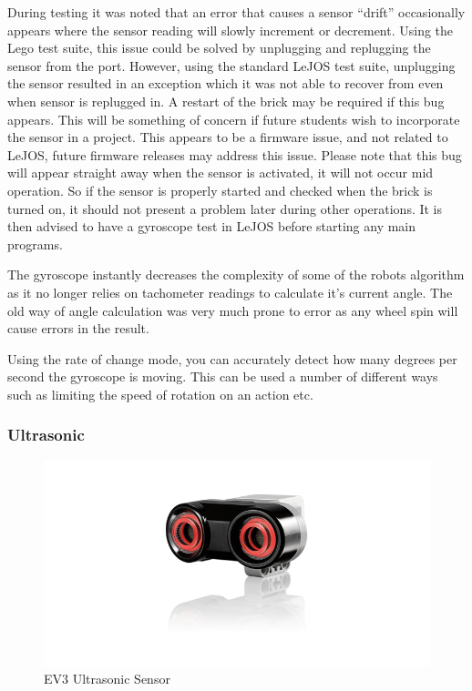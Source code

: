 \documentclass[11pt, a4paper, oneside]{article}
\begin{document}
		During testing it was noted that an error that causes a sensor “drift” occasionally appears where the sensor reading will slowly increment or decrement. Using the Lego test suite, this issue could be solved by unplugging and replugging the sensor from the port. However, using the standard LeJOS test suite, unplugging the sensor resulted in an exception which it was not able to recover from even when sensor is replugged in. A restart of the brick may be required if this bug appears. This will be something of concern if future students wish to incorporate the sensor in a project. This appears to be a firmware issue, and not related to LeJOS, future firmware releases may address this issue. Please note that this bug will appear straight away when the sensor is activated, it will not occur mid operation. So if the sensor is properly started and checked when the brick is turned on, it should not present a problem later during other operations. It is then advised to have a gyroscope test in LeJOS before starting any main programs.\newline
		
		The gyroscope instantly decreases the complexity of some of the robots algorithm as it no longer relies on tachometer readings to calculate it's current angle. The old way of angle calculation was very much prone to error as any wheel spin will cause errors in the result. \newline 

		Using the rate of change mode, you can accurately detect how many degrees per second the gyroscope is moving. This can be used a number of different ways such as limiting the speed of rotation on an action etc.


  		\subsubsection{Ultrasonic}
		\begin{figure}[h]
	  	\centering
	  	\includegraphics[scale=0.45]{img/EV3UltrasonicSensor.png}
	  	\caption{EV3 Ultrasonic Sensor}
		\end{figure}	 
		
\end{document}
